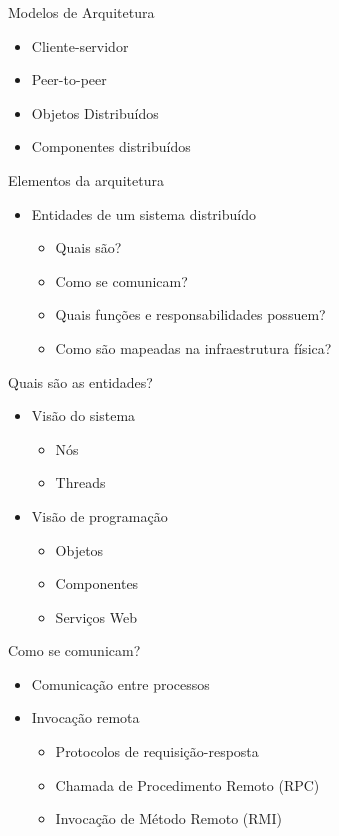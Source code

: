 \documentclass[aspectratio=169,
				xcolor=table]{beamer}
\begin{document}
	\begin{frame}{Modelos de Arquitetura}
		\begin{itemize}
			\item Cliente-servidor
			\vspace{1em}
			\item Peer-to-peer
			\vspace{1em}
			\item Objetos Distribuídos
			\vspace{1em}
			\item Componentes distribuídos
		\end{itemize}
	\end{frame}
	
	\begin{frame}{Elementos da arquitetura}
		\begin{itemize}
			\item Entidades de um sistema distribuído
			\begin{itemize}
				\item Quais são?
				\item Como se comunicam?
				\item Quais funções e responsabilidades possuem?
				\item Como são mapeadas na infraestrutura física?
			\end{itemize}
		\end{itemize}
	\end{frame}
	
	\begin{frame}{Quais são as entidades?}
		\begin{itemize}
			\item Visão do sistema
			\begin{itemize}
				\item Nós 
				\item Threads
			\end{itemize}

			\item Visão de programação
			\begin{itemize}
				\item Objetos
				\item Componentes 
				\item Serviços Web
			\end{itemize}
		\end{itemize}		
	\end{frame}
	
	\begin{frame}{Como se comunicam?}
		\begin{itemize}
			\item Comunicação entre processos
			\vspace{1em}
			\item Invocação remota
			\begin{itemize}
				\item Protocolos de requisição-resposta
				\item Chamada de Procedimento Remoto (RPC)
				\item Invocação de Método Remoto (RMI)
			\end{itemize}
		\end{itemize}
	\end{frame}
	
\end{document}
